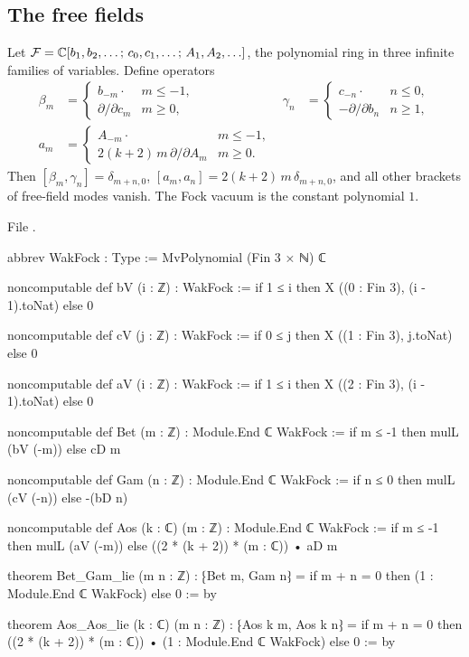 \subsection{The free fields}

\begin{definition}\label{l08:def:wakfock}
Let $\mathcal{F} = {\mathbb{C}}[b_1,b_2,\ldots;\,c_0,c_1,\ldots;\,A_1,A_2,\ldots]$, the polynomial ring in three
infinite families of variables. Define operators
\begin{align*}
  \beta_m &= \begin{cases} b_{-m}\cdot & m\le-1,\\ \partial/\partial c_m & m\ge0,\end{cases}
  &\gamma_n &= \begin{cases} c_{-n}\cdot & n\le0,\\ -\partial/\partial b_n & n\ge1,\end{cases}\\
  a_m &= \begin{cases} A_{-m}\cdot & m\le-1,\\ 2(k+2)\,m\,\partial/\partial A_m & m\ge0.\end{cases}
\end{align*}
Then $[\beta_m,\gamma_n] = \delta_{m+n,0}$, $[a_m,a_n] = 2(k+2)\,m\,\delta_{m+n,0}$, and all other brackets of
free-field modes vanish. The Fock vacuum is the constant polynomial $1$.
\end{definition}

\noindent File .
\begin{leancode}
abbrev WakFock : Type := MvPolynomial (Fin 3 × ℕ) ℂ

noncomputable def bV (i : ℤ) : WakFock := if 1 ≤ i then X ((0 : Fin 3), (i - 1).toNat) else 0

noncomputable def cV (j : ℤ) : WakFock := if 0 ≤ j then X ((1 : Fin 3), j.toNat) else 0

noncomputable def aV (i : ℤ) : WakFock := if 1 ≤ i then X ((2 : Fin 3), (i - 1).toNat) else 0

noncomputable def Bet (m : ℤ) : Module.End ℂ WakFock :=
  if m ≤ -1 then mulL (bV (-m)) else cD m

noncomputable def Gam (n : ℤ) : Module.End ℂ WakFock :=
  if n ≤ 0 then mulL (cV (-n)) else -(bD n)

noncomputable def Aos (k : ℂ) (m : ℤ) : Module.End ℂ WakFock :=
  if m ≤ -1 then mulL (aV (-m)) else ((2 * (k + 2)) * (m : ℂ)) • aD m

theorem Bet_Gam_lie (m n : ℤ) :
    ⁅Bet m, Gam n⁆ = if m + n = 0 then (1 : Module.End ℂ WakFock) else 0 := by

theorem Aos_Aos_lie (k : ℂ) (m n : ℤ) :
    ⁅Aos k m, Aos k n⁆
      = if m + n = 0 then ((2 * (k + 2)) * (m : ℂ)) • (1 : Module.End ℂ WakFock) else 0 := by
\end{leancode}

